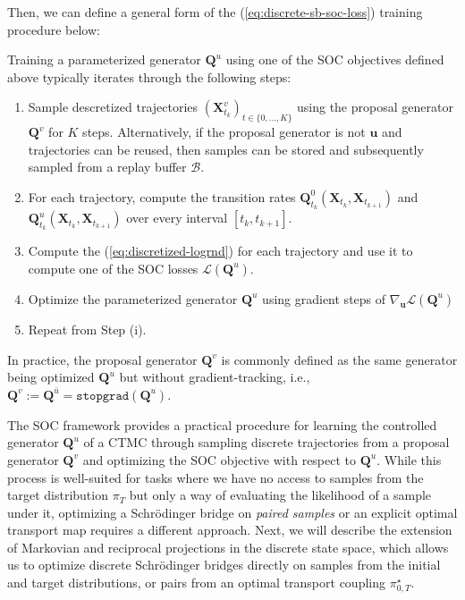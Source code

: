 \documentclass{article}
\newcommand{\purple}[2][]{%
  \begin{purplebox}[#1]
    #2
  \end{purplebox}
}
\begin{document}
Then, we can define a general form of the (\ref{eq:discrete-sb-soc-loss}) training procedure \citep{zhu2025mdns, tang2025tr2} below:
\purple[Discrete SB-SOC Training Framework]{\label{box:discrete-sbsoc}
Training a parameterized generator $\boldsymbol{Q}^u$ using one of the SOC objectives defined above typically iterates through the following steps:
\begin{enumerate}
    \item [(i)] Sample descretized trajectories $(\boldsymbol{X}^v_{t_k})_{t\in \{0, \dots, K\}}$ using the proposal generator $\boldsymbol{Q}^v$ for $K$ steps. Alternatively, if the proposal generator is not $\boldsymbol{u}$ and trajectories can be reused, then samples can be stored and subsequently sampled from a replay buffer $\mathcal{B}$.
    \item[(ii)] For each trajectory, compute the transition rates $\boldsymbol{Q}_{t_k}^0(\boldsymbol{X}_{t_k}, \boldsymbol{X}_{t_{k+1}})$ and $\boldsymbol{Q}_{t_k}^u(\boldsymbol{X}_{t_k}, \boldsymbol{X}_{t_{k+1}})$ over every interval $[t_k ,t_{k+1}]$.
    \item[(ii)] Compute the (\ref{eq:discretized-logrnd}) for each trajectory and use it to compute one of the SOC losses $\mathcal{L}(\boldsymbol{Q}^u)$.
    \item[(iii)] Optimize the parameterized generator $\boldsymbol{Q}^u$ using gradient steps of $\nabla_{\boldsymbol{u}}\mathcal{L}(\boldsymbol{Q}^u)$
    \item [(iv)] Repeat from Step (i).

\end{enumerate}
In practice, the proposal generator $\boldsymbol{Q}^v$ is commonly defined as the same generator being optimized $\boldsymbol{Q}^u$ but without gradient-tracking, i.e., $\boldsymbol{Q}^v:=\boldsymbol{Q}^{\bar{u}}=\texttt{stopgrad}(\boldsymbol{Q}^u)$. 
}

The SOC framework provides a practical procedure for learning the controlled generator $\boldsymbol{Q}^u$ of a CTMC through sampling discrete trajectories from a proposal generator $\boldsymbol{Q}^v$ and optimizing the SOC objective with respect to $\boldsymbol{Q}^u$. While this process is well-suited for tasks where we have no access to samples from the target distribution $\pi_T$ but only a way of evaluating the likelihood of a sample under it, optimizing a Schrödinger bridge on \textit{paired samples} or an explicit optimal transport map requires a different approach. Next, we will describe the extension of Markovian and reciprocal projections in the discrete state space, which allows us to optimize discrete Schrödinger bridges directly on samples from the initial and target distributions, or pairs from an optimal transport coupling $\pi^\star_{0,T}$.
\end{document}

